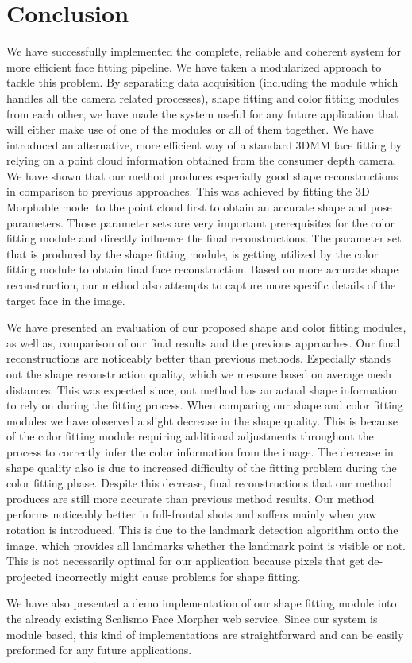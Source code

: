 \chapter{Conclusion}\label{ch5}

We have successfully implemented the complete, reliable and coherent system for more efficient face fitting pipeline. We have taken a modularized approach to tackle this problem. By separating data acquisition (including the module which handles all the camera related processes), shape fitting and color fitting modules from each other, we have made the system useful for any future application that will either make use of one of the modules or all of them together. We have introduced an alternative, more efficient way of a standard 3DMM face fitting by relying on a point cloud information obtained from the consumer depth camera. We have shown that our method produces especially good shape reconstructions in comparison to previous approaches. This was achieved by fitting the 3D Morphable model to the point cloud first to obtain an accurate shape and pose parameters. Those parameter sets are very important prerequisites for the color fitting module and directly influence the final reconstructions. The parameter set that is produced by the shape fitting module, is getting utilized by the color fitting module to obtain final face reconstruction. Based on more accurate shape reconstruction, our method also attempts to capture more specific details of the target face in the image. \bigskip

We have presented an evaluation of our proposed shape and color fitting modules, as well as, comparison of our final results and the previous approaches. Our final reconstructions are noticeably better than previous methods. Especially stands out the shape reconstruction quality, which we measure based on average mesh distances. This was expected since, out method has an actual shape information to rely on during the fitting process. When comparing our shape and color fitting modules we have observed a slight decrease in the shape quality. This is because of the color fitting module requiring additional adjustments throughout the process to correctly infer the color information from the image. The decrease in shape quality also is due to increased difficulty of the fitting problem during the color fitting phase. Despite this decrease, final reconstructions that our method produces are still more accurate than previous method results. Our method performs noticeably better in full-frontal shots and suffers mainly when yaw rotation is introduced. This is due to the landmark detection algorithm onto the image, which provides all landmarks whether the landmark point is visible or not. This is not necessarily optimal for our application because pixels that get de-projected incorrectly might cause problems for shape fitting.\bigskip

We have also presented a demo implementation of our shape fitting module into the already existing Scalismo Face Morpher web service. 
Since our system is module based, this kind of implementations are straightforward and can be easily preformed for any future applications. 





